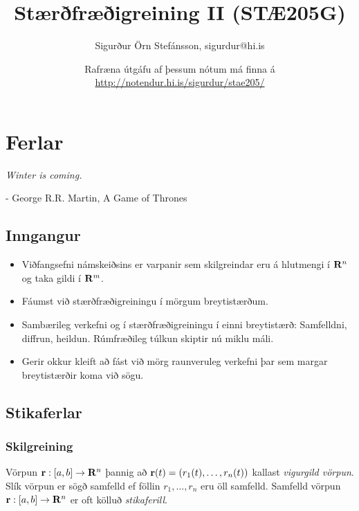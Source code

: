 \documentclass[a4paper,10pt,icelandic]{sphinxmanual}
\title{Stærðfræðigreining II (STÆ205G)}
\date{Rafræna útgáfu af þessum nótum má finna á 
\\\url{http://notendur.hi.is/sigurdur/stae205/}}
\author{Sigurður Örn Stefánsson, sigurdur@hi.is}
\begin{document}
\maketitle
\tableofcontents
{}\label{index::doc}



\chapter{Ferlar}
\label{Kafli1:staerfraeigreining-ii-stae205g-haskoli-islands-vor-2016}\label{Kafli1::doc}\label{Kafli1:ferlar}
\emph{Winter is coming.}

- George R.R. Martin, A Game of Thrones


\section{Inngangur}
\label{Kafli1:inngangur}\begin{itemize}
\item {} 
Viðfangsefni námskeiðsins er varpanir sem skilgreindar eru á
hlutmengi í \(\mbox{${\bf R}^n$}\) og taka gildi í
\(\mbox{${\bf R}^m$}\).

\item {} 
Fáumst við stærðfræðigreiningu í mörgum breytistærðum.

\item {} 
Sambærileg verkefni og í stærðfræðigreiningu í einni breytistærð:
Samfelldni, diffrun, heildun. Rúmfræðileg túlkun skiptir nú miklu
máli.

\item {} 
Gerir okkur kleift að fást við mörg raunveruleg verkefni þar sem
margar breytistærðir koma við sögu.

\end{itemize}


\section{Stikaferlar}
\label{Kafli1:stikaferlar}

\subsection{Skilgreining}
\label{Kafli1:skilgreining}\label{Kafli1:index-0}
Vörpun \(\mbox{${\bf r}$}:  [a,b]\rightarrow \mbox{${\bf R}^n$}\)
þannig að \(\mbox{${\bf r}$}(t)=(r_1(t),\ldots,r_n(t))\) kallast
\emph{vigurgild vörpun}. Slík vörpun er sögð samfelld ef föllin
\(r_1, \ldots, r_n\) eru öll samfelld. Samfelld vörpun
\(\mbox{${\bf r}$}:  [a,b]\rightarrow \mbox{${\bf R}^n$}\) er oft
kölluð \emph{stikaferill}.
\end{document}
